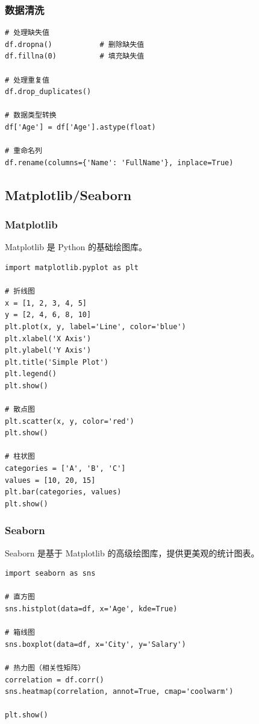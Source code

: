 \documentclass[12pt,UTF8]{ctexbook}
\begin{document}
\subsubsection{数据清洗}

\begin{lstlisting}
# 处理缺失值
df.dropna()           # 删除缺失值
df.fillna(0)          # 填充缺失值

# 处理重复值
df.drop_duplicates()

# 数据类型转换
df['Age'] = df['Age'].astype(float)

# 重命名列
df.rename(columns={'Name': 'FullName'}, inplace=True)
\end{lstlisting}

\subsection{Matplotlib/Seaborn}

\subsubsection{Matplotlib}

Matplotlib 是 Python 的基础绘图库。

\begin{lstlisting}
import matplotlib.pyplot as plt

# 折线图
x = [1, 2, 3, 4, 5]
y = [2, 4, 6, 8, 10]
plt.plot(x, y, label='Line', color='blue')
plt.xlabel('X Axis')
plt.ylabel('Y Axis')
plt.title('Simple Plot')
plt.legend()
plt.show()

# 散点图
plt.scatter(x, y, color='red')
plt.show()

# 柱状图
categories = ['A', 'B', 'C']
values = [10, 20, 15]
plt.bar(categories, values)
plt.show()
\end{lstlisting}

\subsubsection{Seaborn}

Seaborn 是基于 Matplotlib 的高级绘图库，提供更美观的统计图表。

\begin{lstlisting}
import seaborn as sns

# 直方图
sns.histplot(data=df, x='Age', kde=True)

# 箱线图
sns.boxplot(data=df, x='City', y='Salary')

# 热力图（相关性矩阵）
correlation = df.corr()
sns.heatmap(correlation, annot=True, cmap='coolwarm')

plt.show()
\end{lstlisting}
\end{document}
